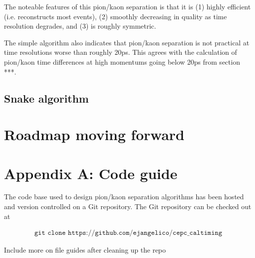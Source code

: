 \documentclass[12pt,twoside,letterpaper]{article}
\begin{document}
The noteable features of this pion/kaon separation is that it is (1) highly efficient (i.e. reconstructs most events), (2) smoothly decreasing in quality as time resolution degrades, and (3) is roughly symmetric. 

The simple algorithm also indicates that pion/kaon separation is not practical at time resolutions worse than roughly 20ps. This agrees with the calculation of pion/kaon time differences at high momentums going below 20ps from section ***. 

\subsection{Snake algorithm}





\section{Roadmap moving forward}



\section{Appendix A: Code guide}

The code base used to design pion/kaon separation algorithms has been hosted and version controlled on a Git repository. The Git repository can be checked out at 

\begin{align}
\texttt{git clone https://github.com/ejangelico/cepc\_caltiming}
\end{align}

Include more on file guides after cleaning up the repo
\end{document}
